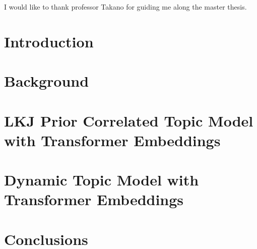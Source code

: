 \documentclass[master,final,11pt]{iscs-thesis}
\date{\today}
\begin{document}
\begin{eabstract}

\end{eabstract}
\begin{jabstract}

\end{jabstract}
\maketitle
\begin{acknowledge}
I would like to thank professor Takano for guiding me along the master thesis.
\end{acknowledge}
\frontmatter %
\tableofcontents %
\listoffigures %
\listoftables %
\listofalgorithms
\mainmatter %
\titlepage
\chapter{Introduction}\label{ch1}



\chapter{Background}\label{ch2}

%
%
%
\chapter{LKJ Prior Correlated Topic Model with Transformer Embeddings}\label{ch4}



\chapter{Dynamic Topic Model with Transformer Embeddings}\label{ch5}



\chapter{Conclusions}\label{ch6}

\cite{wallach_rethinking_nodate}
%
\end{document}
